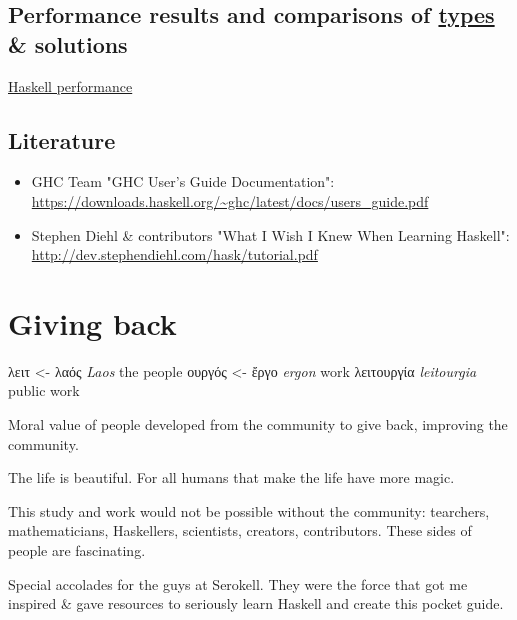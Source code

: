 \documentclass[a4paper,14pt,oneside]{book}
\begin{document}
\chapter{Performance results and comparisons of \hyperref[org3dcb7ed]{types} \& solutions}
\label{sec:org482f3d2}
\href{https://github.com/haskell-perf}{Haskell performance}

\chapter{Literature}
\label{sec:org153dfe6}

\begin{itemize}
\item GHC Team "GHC User’s Guide Documentation": \url{https://downloads.haskell.org/\~ghc/latest/docs/users\_guide.pdf}
\item Stephen Diehl \& contributors "What I Wish I Knew When Learning Haskell": \url{http://dev.stephendiehl.com/hask/tutorial.pdf}
\end{itemize}

\part{Giving back}
\label{sec:org0e8f777}

\textgreek{λειτ}       <- \textgreek{λαός}  \emph{Laos}       the people
    \textgreek{ουργός} <- \textgreek{ἔργο}  \emph{ergon}             work
\textgreek{λειτουργία}          \emph{leitourgia} public work

Moral value of people developed from the community to give back, improving the community.

The life is beautiful.
For all humans that make the life have more magic.

This study and work would not be possible without the community: tearchers, mathematicians, Haskellers, scientists, creators, contributors. These sides of people are fascinating.


Special accolades for the guys at Serokell. They were the force that got me inspired \& gave resources to seriously learn Haskell and create this pocket guide.
\end{document}
